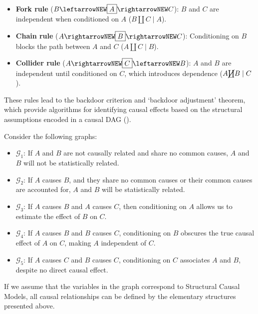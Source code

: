 \documentclass[
  single column]{article}
\providecommand{\tightlist}{%
  \setlength{\itemsep}{0pt}\setlength{\parskip}{0pt}}\usepackage{longtable,booktabs,array}
\begin{document}
\begin{itemize}
\tightlist
\item
  \textbf{Fork rule} (\(B \leftarrowNEW \boxed{A} \rightarrowNEW C\)):
  \(B\) and \(C\) are independent when conditioned on \(A\)
  (\(B \coprod C \mid A\)).
\item
  \textbf{Chain rule} (\(A \rightarrowNEW \boxed{B} \rightarrowNEW C\)):
  Conditioning on \(B\) blocks the path between \(A\) and \(C\)
  (\(A \coprod C \mid B\)).
\item
  \textbf{Collider rule}
  (\(A \rightarrowNEW \boxed{C} \leftarrowNEW B\)): \(A\) and \(B\) are
  independent until conditioned on \(C\), which introduces dependence
  (\(A \cancel{\coprod} B \mid C\)).
\end{itemize}

These rules lead to the backdoor criterion and `backdoor adjustment'
theorem, which provide algorithms for identifying causal effects based
on the structural assumptions encoded in a causal DAG
().

Consider the following graphs:

\begin{itemize}
\tightlist
\item
  \textbf{\(\mathcal{G}_1\)}: If \(A\) and \(B\) are not causally
  related and share no common causes, \(A\) and \(B\) will not be
  statistically related.
\item
  \textbf{\(\mathcal{G}_2\)}: If \(A\) causes \(B\), and they share no
  common causes or their common causes are accounted for, \(A\) and
  \(B\) will be statistically related.
\item
  \textbf{\(\mathcal{G}_3\)}: If \(A\) causes \(B\) and \(A\) causes
  \(C\), then conditioning on \(A\) allows us to estimate the effect of
  \(B\) on \(C\).
\item
  \textbf{\(\mathcal{G}_4\)}: If \(A\) causes \(B\) and \(B\) causes
  \(C\), conditioning on \(B\) obscures the true causal effect of \(A\)
  on \(C\), making \(A\) independent of \(C\).
\item
  \textbf{\(\mathcal{G}_5\)}: If \(A\) causes \(C\) and \(B\) causes
  \(C\), conditioning on \(C\) associates \(A\) and \(B\), despite no
  direct causal effect.
\end{itemize}

If we assume that the variables in the graph correspond to Structural
Causal Models, all causal relationships can be defined by the elementary
structures presented above.
\end{document}
